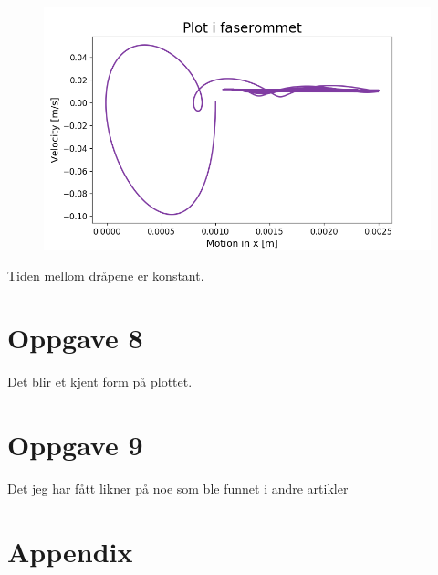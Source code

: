 \documentclass[norsk,a4paper,12pt]{article}
\begin{document}
\begin{figure}[H]
\begin{center}
\includegraphics[scale=0.5]{Oppgave7faseplott.png}
\label{fig:faseplot5del2.png}
\end{center}
\end{figure}

Tiden mellom dråpene er konstant.


\section*{Oppgave 8}


Det blir et kjent form på plottet.


\section*{Oppgave 9}

Det jeg har fått likner på noe som ble funnet i andre artikler


\newpage


\section*{Appendix}
















\end{document}
